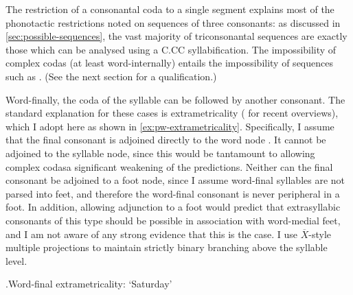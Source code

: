 The restriction of a consonantal coda to a single segment explains most of the phonotactic restrictions noted on sequences of three consonants: as discussed in \cref{sec:possible-sequences}, the vast majority of triconsonantal sequences are exactly those which can be analysed using a C.CC syllabification. The impossibility  of complex codas (at least word-internally) entails the impossibility of sequences such as \ipa{[sln]}. (See the next section for a qualification.)

Word-finally, the coda of the syllable can be followed by another consonant. The standard explanation for these cases is extrametricality (\citealp[\cf][]{vaux09,cote11:_final} for recent overviews), which I adopt here as shown in \ref{ex:pw-extrametricality}. Specifically, I assume that the final consonant is adjoined directly to the word node \citep[\egm][]{rubach90:_edge_of_const_effec_in_polis}. It cannot be adjoined to the syllable node, since this would be tantamount to allowing complex codas\dash a significant weakening of the predictions. Neither can the final consonant be adjoined to a foot node, since I assume word-final syllables are not parsed into feet, and therefore the word-final consonant is never peripheral in a foot. In addition, allowing adjunction to a foot would predict that extrasyllabic consonants of this type should be possible in association with word\hyp medial feet, and I am not aware of any strong evidence that this is the case. I use $\overline{X}$-style multiple projections \citep[\egm][]{levin85,smith-gaelic,itomester-fajl4,itomester-pword} to maintain strictly binary branching above the syllable level.

\ex.\label{ex:pw-extrametricality}Word-final extrametricality: \ipa{[ˈsaːdurn]} `Saturday'\\


